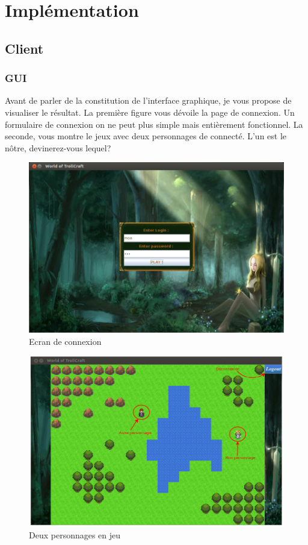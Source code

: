 \documentclass[11pt, a4paper]{report}
\begin{document}
\chapter{Implémentation}
  
  \section{Client}
  
    \subsection{GUI}

Avant de parler de la constitution de l'interface graphique, je vous propose de visualiser le résultat. La première figure vous dévoile la page de connexion. Un formulaire de connexion on ne peut plus simple mais entièrement fonctionnel.
La seconde, vous montre le jeux avec deux personnages de connecté. L'un est le nôtre, devinerez-vous lequel?

\begin{figure}[!ht]
   \includegraphics[width=16cm]{page_connexion.png}
   \caption{Ecran de connexion}
\end{figure}

\begin{figure}[!ht]
   \includegraphics[width=16cm]{game.png}
   \caption{Deux personnages en jeu}
\end{figure}
\end{document}
